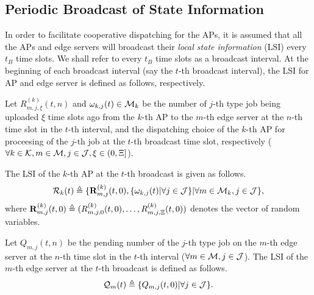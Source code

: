 \subsection{Periodic Broadcast of State Information}
In order to facilitate cooperative dispatching for the APs, it is assumed that all the APs and edge servers will broadcast their \emph{local state information} (LSI) every $t_B$ time slots.
We shall refer to every $t_B$ time slots as a broadcast interval.
At the beginning of each broadcast interval (say the $t$-th broadcast interval), the LSI for AP and edge server is defined as follows, respectively.

\begin{definition}
    Let $R^{(k)}_{m,j,\xi}({t,n})$ and $\omega_{k,j}(t) \in \mathcal{M}_{k}$ be the number of $j$-th type job being uploaded  $\xi$ time slots ago from the $k$-th AP to the $m$-th edge server at the $n$-th time slot in the $t$-th interval, and the dispatching choice of the $k$-th AP for proceesing of the $j$-th job at the $t$-th broadcast time slot, respectively ($\forall k\in\mathcal{K}, m\in\mathcal{M}, j\in\mathcal{J}, \xi\in(0,\Xi]$).
    
    The LSI of the $k$-th AP at the $t$-th broadcast is given as follows.
    \begin{align}
        \mathcal{R}_{k}(t) \triangleq \{\mathbf{R}^{(k)}_{m,j}(t,0), \{\omega_{k,j}(t)|\forall j\in\mathcal{J}\} | \forall m\in\mathcal{M}_{k}, j\in\mathcal{J}\},
    \end{align}
    where
    $\mathbf{R}^{(k)}_{m,j}(t,0) \triangleq ( R^{(k)}_{m,j,0}(t,0), \dots, R^{(k)}_{m,j,\Xi}(t,0) )$
    denotes the vector of random variables.
\end{definition}

\begin{definition}
    Let $Q_{m,j}({t,n})$ be the pending number of the $j$-th type job on the $m$-th edge server at the $n$-th time slot in the $t$-th interval ($\forall m\in\mathcal{M}, j\in\mathcal{J}$).
    The LSI of the $m$-th edge server at the $t$-th broadcast is defined as follows.
    \begin{align}
        \mathcal{Q}_{m}(t) \triangleq \{Q_{m,j}(t, 0) | \forall j\in\mathcal{J}\}.
    \end{align}
\end{definition}

